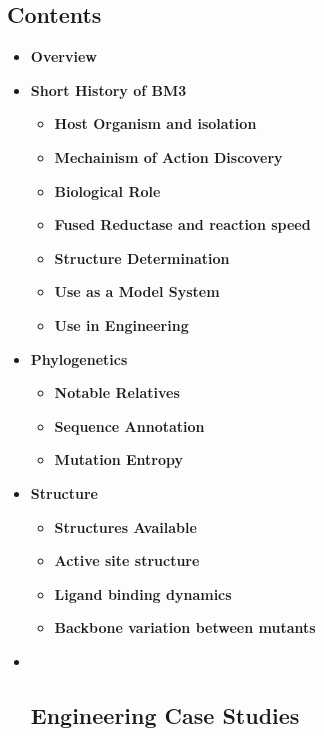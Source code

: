 \hypertarget{contents-5}{%
\subsection{Contents}\label{contents-5}}

\begin{itemize}
\item
  \textbf{Overview}
\item
  \textbf{Short History of BM3}

  \begin{itemize}
  \tightlist
  \item
    \textbf{Host Organism and isolation}
  \item
    \textbf{Mechainism of Action Discovery}
  \item
    \textbf{Biological Role}
  \item
    \textbf{Fused Reductase and reaction speed}
  \item
    \textbf{Structure Determination}
  \item
    \textbf{Use as a Model System}
  \item
    \textbf{Use in Engineering}
  \end{itemize}
\item
  \textbf{Phylogenetics}

  \begin{itemize}
  \tightlist
  \item
    \textbf{Notable Relatives}
  \item
    \textbf{Sequence Annotation}
  \item
    \textbf{Mutation Entropy}
  \end{itemize}
\item
  \textbf{Structure}

  \begin{itemize}
  \tightlist
  \item
    \textbf{Structures Available}
  \item
    \textbf{Active site structure}
  \item
    \textbf{Ligand binding dynamics}
  \item
    \textbf{Backbone variation between mutants}
  \end{itemize}
\item ~
  \hypertarget{engineering-case-studies}{%
  \subsection{\texorpdfstring{\textbf{Engineering Case
  Studies}}{Engineering Case Studies}}\label{engineering-case-studies}}
\end{itemize}


